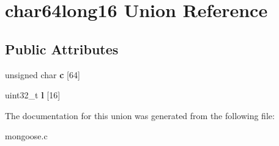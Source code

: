 \hypertarget{unionchar64long16}{}\section{char64long16 Union Reference}
\label{unionchar64long16}
\subsection*{Public Attributes}
\begin{DoxyCompactItemize}
\item 
\mbox{\label{unionchar64long16_a7067dbe3b0ff3f11661acb8cd97bcff9}} 
unsigned char {\bfseries c} \mbox{[}64\mbox{]}
\item 
\mbox{\label{unionchar64long16_a4f1edebae3468a551ff2d0cdaecb467d}} 
uint32\+\_\+t {\bfseries l} \mbox{[}16\mbox{]}
\end{DoxyCompactItemize}


The documentation for this union was generated from the following file\+:\begin{DoxyCompactItemize}
\item 
mongoose.\+c\end{DoxyCompactItemize}
